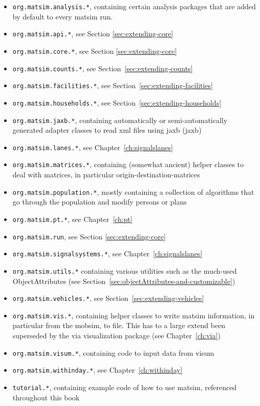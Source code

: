 \begin{itemize}\styleItemize
\item \lstinline{org.matsim.analysis.*}, containing certain analysis packages that are added by default to every \gls{matsim} run.
\item \lstinline{org.matsim.api.*}, see Section \ref{sec:extending-core}
\item \lstinline{org.matsim.core.*}, see Section \ref{sec:extending-core}
\item \lstinline{org.matsim.counts.*}, see Section~\ref{sec:extending-counts}
\item \lstinline{org.matsim.facilities.*}, see Section~\ref{sec:extending-facilities}
\item \lstinline{org.matsim.households.*}, see Section~\ref{sec:extending-households}
\item \lstinline{org.matsim.jaxb.*}, containing automatically or semi-automatically generated adapter classes to read \gls{xml} files using \acrshort{jaxb} (\acrlong{jaxb})
\item \lstinline{org.matsim.lanes.*}, see Chapter~\ref{ch:signalslanes}
\item \lstinline{org.matsim.matrices.*}, containing  (somewhat ancient) helper classes to deal with matrices, in particular origin-destination-matrices
\item \lstinline{org.matsim.population.*}, mostly containing a collection of algorithms that go through the population and modify persons or plans
\item \lstinline{org.matsim.pt.*}, see Chapter~\ref{ch:pt}
\item \lstinline{org.matsim.run}, see Section \ref{sec:extending-core}
\item \lstinline{org.matsim.signalsystems.*}, see Chapter~\ref{ch:signalslanes}
\item \lstinline{org.matsim.utils.*} containing various utilities such as the much-used ObjectAttributes
(see Section~\ref{sec:objectAttributes-and-customizable})
\item \lstinline{org.matsim.vehicles.*}, see Section~\ref{sec:extending-vehicles}
\item \lstinline{org.matsim.vis.*}, containing helper classes to write \gls{matsim} information, in particular from the \gls{mobsim}, to file.  This has to a large extend been superseded by the \gls{via} visualization package (see Chapter~\ref{ch:via})
\item \lstinline{org.matsim.visum.*}, containing code to input data from \gls{visum}
\item \lstinline{org.matsim.withinday.*}, see Chapter~\ref{ch:withinday}
\item \lstinline{tutorial.*}, containing example code of how to use \gls{matsim}, referenced throughout this book
\end{itemize}


